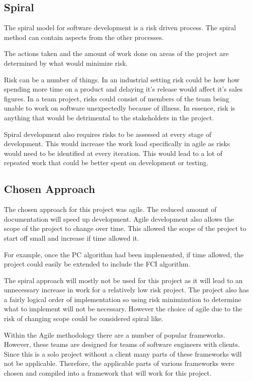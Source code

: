 \documentclass{UoYCSproject}
\begin{document}
\subsection{Spiral}
The spiral model for software development is a risk driven process. The spiral method can contain aspects from the other processes. ~\parencite{boehm1988spiral}

The actions taken and the amount of work done on areas of the project are determined by what would minimize risk.

Risk can be a number of things. In an industrial setting risk could be how how spending more time on a product and delaying it's release would affect it's sales figures. In a team project, risks could  consist of members of the team being unable to work on software unexpectedly because of illness. In essence, risk is anything that would be detrimental to the stakeholders in the project.

Spiral development also requires risks to be assessed at every stage of development. This would increase the work load specifically in agile as risks would need to be identified at every iteration. This would lead to a lot of repeated work that could be better spent on development or testing.  
\subsection{Chosen Approach}

The chosen approach for this project was agile. The reduced amount of documentation will speed up development. Agile development also allows the scope of the project to change over time. This allowed the scope of the project to start off small and increase if time allowed it.

For example, once the PC algorithm had been implemented, if time allowed, the project could easily be extended to include the FCI algorithm.

The spiral approach will mostly not be used for this project as it will lead to an unnecessary increase in work for a relatively low risk project. The project also has a fairly logical order of implementation so using risk minimization to determine what to implement will not be necessary. However the choice of agile due to the risk of changing scope could be considered spiral like.

Within the Agile methodology there are a number of popular frameworks. However, these teams are designed for teams of software engineers with clients. Since this is a solo project without a client many parts of these frameworks will not be applicable. Therefore, the applicable parts of various frameworks were chosen and compiled into a framework that will work for this project.
\end{document}
